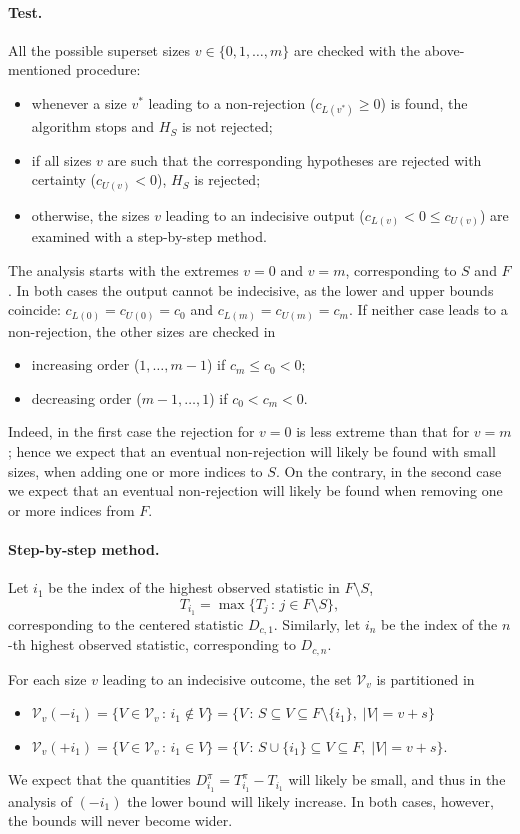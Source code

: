 \documentclass[11pt,a4paper,openright,twoside]{article}
\begin{document}
\vspace{3mm}
\paragraph{Test.} All the possible superset sizes $v\in\{0,1,\ldots,m\}$ are checked with the above-mentioned procedure:
\begin{itemize}
\item whenever a size $v^*$ leading to a non-rejection ($c_{L(v^*)}\geq 0$) is found, the algorithm stops and $H_S$ is not rejected;
\item if all sizes $v$ are such that the corresponding hypotheses are rejected with certainty ($c_{U(v)}<0$), $H_S$ is rejected;
\item otherwise, the sizes $v$ leading to an indecisive output ($c_{L(v)}<0\leq c_{U(v)}$) are examined with a step-by-step method.
\end{itemize}

The analysis starts with the extremes $v=0$ and $v=m$, corresponding to $S$ and $F$. In both cases the output cannot be indecisive, as the lower and upper bounds coincide: $c_{L(0)}=c_{U(0)}=c_0$ and $c_{L(m)}=c_{U(m)}=c_m$. If neither case leads to a non-rejection, the other sizes are checked in
\begin{itemize}
\item increasing order ($1,\ldots,m-1$) if $c_{m}\leq c_{0}<0$;
\item decreasing order ($m-1,\ldots,1$) if $c_{0}< c_{m}<0$.
\end{itemize}
Indeed, in the first case the rejection for $v=0$ is less extreme than that for $v=m$; hence we expect that an eventual non-rejection will likely be found with small sizes, when adding one or more indices to $S$. On the contrary, in the second case we expect that an eventual non-rejection will likely be found when removing one or more indices from $F$.

\vspace{3mm}
\paragraph{Step-by-step method.} Let $i_1$ be the index of the highest observed statistic in $F\setminus S$,
\[T_{i_1}=\max\{T_j\,:\,j\in F\setminus S\},\]
corresponding to the centered statistic $D_{c,1}$. Similarly, let $i_n$ be the index of the $n$-th highest observed statistic, corresponding to $D_{c,n}$.

For each size $v$ leading to an indecisive outcome, the set $\mathcal{V}_v$ is partitioned in
\begin{itemize}
\item $\mathcal{V}_v(-i_1)=\{V\in\mathcal{V}_v\,:\,i_1\notin V\}=\{V\,:\,S\subseteq V\subseteq F\setminus\{i_1\},\;|V|=v+s\}$
\item $\mathcal{V}_v(+i_1)=\{V\in\mathcal{V}_v\,:\,i_1\in V\}=\{V\,:\,S\cup\{i_1\}\subseteq V\subseteq F,\;|V|=v+s\}$.
\end{itemize}
We expect that the quantities $D_{i_1}^{\pi}=T_{i_1}^{\pi}-T_{i_1}$ will likely be small, and thus in the analysis of $(-i_1)$ the lower bound will likely increase. In both cases, however, the bounds will never become wider.
\end{document}
